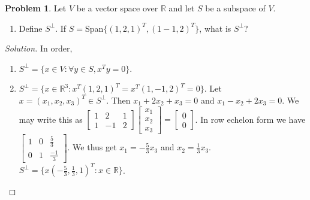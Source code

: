 \documentclass[oneside]{book}
\theoremstyle{definition}
\newtheorem{problem}{Problem}[section]
\begin{document}
\begin{problem}
Let $V$ be a vector space over $\mathbb{R}$ and let $S$ be a subspace of $V$.
\begin{enumerate}
\item Define $S^{\perp}$.
If $S = $Span$\{ (1,2,1)^T, (1-1,2)^T\}$, what is $S^{\perp}$?
\end{enumerate}
\end{problem}
\begin{proof}[Solution]
In order,
\begin{enumerate}
\item $S^{\perp} = \{x\in V: \forall y\in S, x^T y = 0\}$.
\item $S^{\perp} = \{x\in \mathbb{R}^3: x^T (1,2,1)^T = x^T(1,-1,2)^T = 0\}$. Let $x = (x_1,x_2,x_3)^T \in S^{\perp}$. Then $x_1+2x_2+x_3=0$ and $x_1-x_2+2x_3 = 0$. We may write this as $\begin{bmatrix} 1 & 2 & 1 \\ 1 & -1 & 2 \end{bmatrix} \begin{bmatrix} x_1 \\ x_2\\ x_3 \end{bmatrix} = \begin{bmatrix} 0 \\ 0 \end{bmatrix}$. In row echelon form we have $\begin{bmatrix} 1 & 0 & \frac{5}{3} \\ 0 & 1 & \frac{-1}{3} \end{bmatrix}$. We thus get $x_1 = - \frac{5}{3}x_3$ and $x_2 = \frac{1}{3} x_3$.  $S^{\perp} = \{x(-\frac{5}{3}, \frac{1}{3}, 1)^T: x\in \mathbb{R}\}$.
\end{enumerate}
\end{proof}
\end{document}
